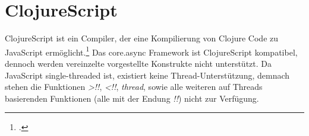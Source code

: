 \section{ClojureScript}
ClojureScript ist ein Compiler, der eine Kompilierung von Clojure Code zu JavaScript ermöglicht.\footcite{CLJS} Das core.async Framework ist ClojureScript kompatibel, dennoch werden vereinzelte vorgestellte Konstrukte nicht unterstützt. Da JavaScript single-threaded ist, existiert keine Thread-Unterstützung, demnach stehen die Funktionen \textit{>!!}, \textit{<!!}, \textit{thread}, sowie alle weiteren auf Threads basierenden Funktionen (alle mit der Endung \textit{!!}) nicht zur Verfügung.
\acresetall